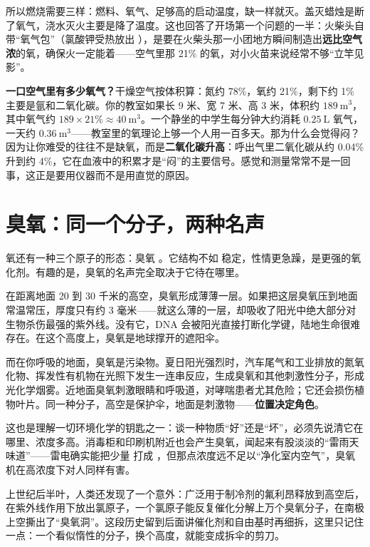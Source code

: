 所以燃烧需要三样：燃料、氧气、足够高的启动温度，缺一样就灭。盖灭蜡烛是断了氧气，浇水灭火主要是降了温度。这也回答了开场第一个问题的一半：火柴头自带“氧气包”（氯酸钾受热放出 ），是要在火柴头那一小团地方瞬间制造出\textbf{远比空气浓}的氧，确保火一定能着——空气里那 21\% 的氧，对小火苗来说经常不够“立竿见影”。

\begin{qiaoliang}
\textbf{一口空气里有多少氧气？}干燥空气按体积算：氮约 78\%，氧约 21\%，剩下约 1\% 主要是氩和二氧化碳。你的教室如果长 9 米、宽 7 米、高 3 米，体积约 $189\ \mathrm{m^3}$，其中氧气约 $189\times 21\% \approx 40\ \mathrm{m^3}$。一个静坐的中学生每分钟大约消耗 $0.25\ \mathrm{L}$ 氧气，一天约 $0.36\ \mathrm{m^3}$——教室里的氧理论上够一个人用一百多天。那为什么会觉得闷？因为让你难受的往往不是缺氧，而是\textbf{二氧化碳升高}：呼出气里二氧化碳从约 0.04\% 升到约 4\%，它在血液中的积累才是“闷”的主要信号。感觉和测量常常不是一回事，这正是要用仪器而不是用直觉的原因。
\end{qiaoliang}

\section{臭氧：同一个分子，两种名声}

氧还有一种三个原子的形态：臭氧 。它结构不如  稳定，性情更急躁，是更强的氧化剂。有趣的是，臭氧的名声完全取决于它待在哪里。

在距离地面 20 到 30 千米的高空，臭氧形成薄薄一层。如果把这层臭氧压到地面常温常压，厚度只有约 3 毫米——就这么薄的一层，却吸收了阳光中绝大部分对生物杀伤最强的紫外线。没有它，DNA 会被阳光直接打断化学键，陆地生命很难存在。在这个高度上，臭氧是地球撑开的遮阳伞。

而在你呼吸的地面，臭氧是污染物。夏日阳光强烈时，汽车尾气和工业排放的氮氧化物、挥发性有机物在光照下发生一连串反应，生成臭氧和其他刺激性分子，形成光化学烟雾。近地面臭氧刺激眼睛和呼吸道，对哮喘患者尤其危险；它还会损伤植物叶片。同一种分子，高空是保护伞，地面是刺激物——\textbf{位置决定角色}。

这也是理解一切环境化学的钥匙之一：谈一种物质“好”还是“坏”，必须先说清它在哪里、浓度多高。消毒柜和印刷机附近也会产生臭氧，闻起来有股淡淡的“雷雨天味道”——雷电确实能把少量  打成 ，但那点浓度远不足以“净化室内空气”，臭氧机在高浓度下对人同样有害。

上世纪后半叶，人类还发现了一个意外：广泛用于制冷剂的氟利昂释放到高空后，在紫外线作用下放出氯原子，一个氯原子能反复催化分解上万个臭氧分子，在南极上空撕出了“臭氧洞”。这段历史留到后面讲催化剂和自由基时再细拆，这里只记住一点：一个看似惰性的分子，换个高度，就能变成拆伞的剪刀。

